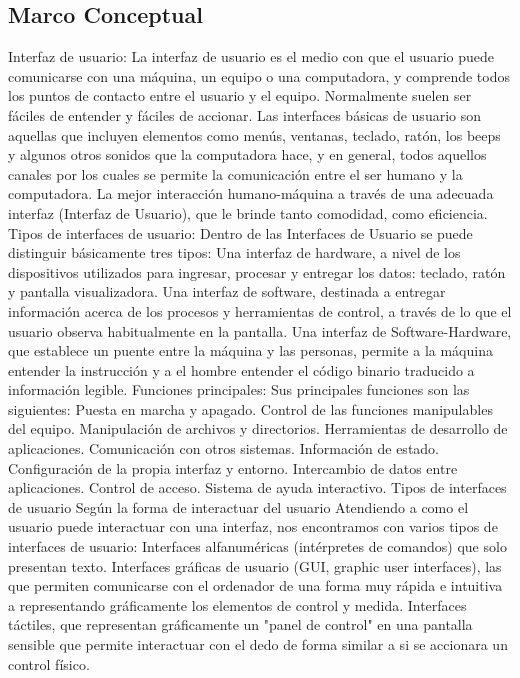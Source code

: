 	\subsection{Marco Conceptual}
		Interfaz de usuario: La interfaz de usuario es el medio con que el usuario puede comunicarse con una máquina, un equipo o una computadora, y comprende todos los puntos de contacto entre el usuario y el equipo. Normalmente suelen ser fáciles de entender y fáciles de accionar. Las interfaces básicas de usuario son aquellas que incluyen elementos como menús, ventanas, teclado, ratón, los beeps y algunos otros sonidos que la computadora hace, y en general, todos aquellos canales por los cuales se permite la comunicación entre el ser humano y la computadora. La mejor interacción humano-máquina a través de una adecuada interfaz (Interfaz de Usuario), que le brinde tanto comodidad, como eficiencia.
		Tipos de interfaces de usuario: Dentro de las Interfaces de Usuario se puede distinguir básicamente tres tipos:
		Una interfaz de hardware, a nivel de los dispositivos utilizados para ingresar, procesar y entregar los datos: teclado, ratón y pantalla visualizadora.
		Una interfaz de software, destinada a entregar información acerca de los procesos y herramientas de control, a través de lo que el usuario observa habitualmente en la pantalla.
		Una interfaz de Software-Hardware, que establece un puente entre la máquina y las personas, permite a la máquina entender la instrucción y a el hombre entender el código binario traducido a información legible.
		Funciones principales: Sus principales funciones son las siguientes:
		Puesta en marcha y apagado.
		Control de las funciones manipulables del equipo.
		Manipulación de archivos y directorios.
		Herramientas de desarrollo de aplicaciones.
		Comunicación con otros sistemas.
		Información de estado.
		Configuración de la propia interfaz y entorno.
		Intercambio de datos entre aplicaciones.
		Control de acceso.
		Sistema de ayuda interactivo.
		Tipos de interfaces de usuario
		Según la forma de interactuar del usuario
		Atendiendo a como el usuario puede interactuar con una interfaz, nos encontramos con varios tipos de interfaces de usuario:
		Interfaces alfanuméricas (intérpretes de comandos) que solo presentan texto.
		Interfaces gráficas de usuario (GUI, graphic user interfaces), las que permiten comunicarse con el ordenador de una forma muy rápida e intuitiva a representando gráficamente los elementos de control y medida.
		Interfaces táctiles, que representan gráficamente un "panel de control" en una pantalla sensible que permite interactuar con el dedo de forma similar a si se accionara un control físico.

